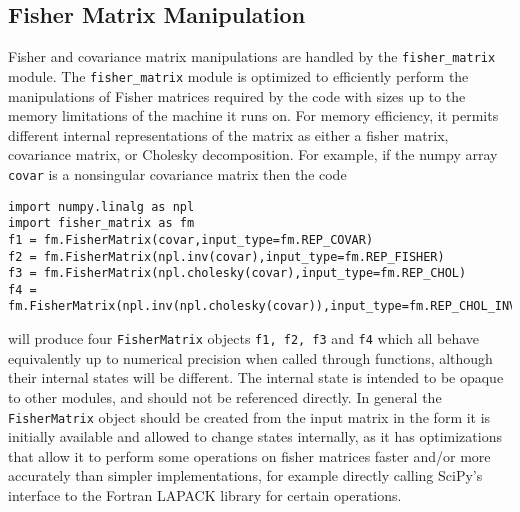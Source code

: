 \documentclass[a4paper,11pt]{article}
\begin{document}
\subsection{Fisher Matrix Manipulation}
Fisher and covariance matrix manipulations are handled by the \texttt{fisher\_matrix} module. The \texttt{fisher\_matrix} module is optimized to efficiently perform the manipulations of Fisher matrices required by the code with sizes up to the memory limitations of the machine it runs on. For memory efficiency, it permits different internal representations of the matrix as either a fisher matrix, covariance matrix, or Cholesky decomposition. For example, if the numpy array \texttt{covar} is a nonsingular covariance matrix then the code
\begin{verbatim}
import numpy.linalg as npl
import fisher_matrix as fm
f1 = fm.FisherMatrix(covar,input_type=fm.REP_COVAR)
f2 = fm.FisherMatrix(npl.inv(covar),input_type=fm.REP_FISHER)
f3 = fm.FisherMatrix(npl.cholesky(covar),input_type=fm.REP_CHOL)
f4 = fm.FisherMatrix(npl.inv(npl.cholesky(covar)),input_type=fm.REP_CHOL_INV)
\end{verbatim}
will produce four \texttt{FisherMatrix} objects \texttt{f1, f2, f3} and \texttt{f4} which all behave equivalently up to numerical precision when called through functions, although their internal states will be different. The internal state is intended to be opaque to other modules, and should not be referenced directly. In general the \texttt{FisherMatrix} object should be created from the input matrix in the form it is initially available and allowed to change states internally, as it has optimizations that allow it to perform some operations on fisher matrices faster and/or more accurately than simpler implementations, for example directly calling SciPy's interface to the Fortran LAPACK library for certain operations. 
\\
\end{document}
